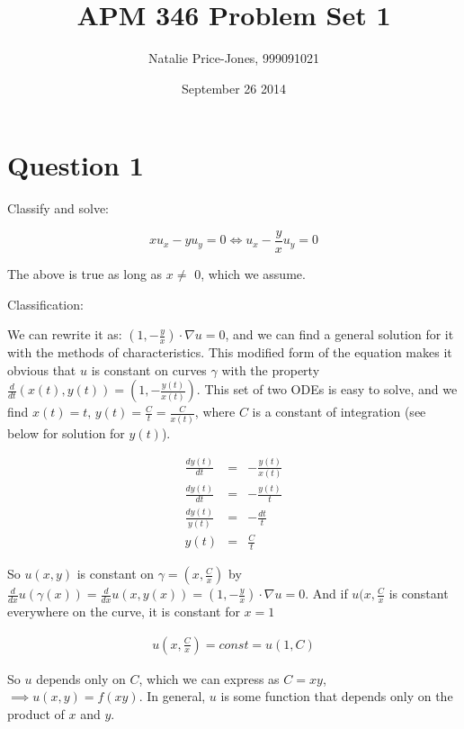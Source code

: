\documentclass[a4paper,12pt]{article}
\begin{document}
\onehalfspacing
\title{APM 346 Problem Set 1}
\author{Natalie Price-Jones, 999091021}
\date{September 26 2014}
\maketitle

\section{Question 1}

Classify and solve:

\begin{equation}
xu_x - yu_y = 0 \Longleftrightarrow u_x - \frac{y}{x}u_y = 0\nonumber
\end{equation}

The above is true as long as $x\neq$ 0, which we assume. 

Classification: 

We can rewrite it as: $(1,-\frac{y}{x})\cdot\nabla u = 0$, and we can find a general solution for it with the methods of characteristics. This modified form of the equation makes it obvious that $u$ is constant on curves $\gamma$ with the property $\frac{d}{dt}(x(t),y(t)) = (1,-\frac{y(t)}{x(t)})$. This set of two ODEs is easy to solve, and we find $x(t) = t,\,y(t) = \frac{C}{t} = \frac{C}{x(t)}$, where $C$ is a constant of integration (see below for solution for $y(t)$).

\begin{eqnarray}
\frac{dy(t)}{dt} &=& -\frac{y(t)}{x(t)}\nonumber\\
\frac{dy(t)}{dt} &=& -\frac{y(t)}{t}\nonumber\\
\frac{dy(t)}{y(t)} &=& -\frac{dt}{t}\nonumber\\
y(t) &=& \frac{C}{t}\nonumber
\end{eqnarray}

So $u(x,y)$ is constant on $\gamma = (x,\frac{C}{x})$ by $\frac{d}{dx}u(\gamma(x)) = \frac{d}{dx}u(x,y(x)) = (1,-\frac{y}{x})\cdot\nabla u = 0$. And if $u(x,\frac{C}{x}$ is constant everywhere on the curve, it is constant for $x = 1$

\begin{eqnarray}
u(x,\frac{C}{x}) = const = u(1,C)\nonumber
\end{eqnarray}

So $u$ depends only on $C$, which we can express as $C = xy$, $\implies \boxed{u(x,y) = f(xy)}$. In general, $u$ is some function that depends only on the product of $x$ and $y$.
\end{document}
